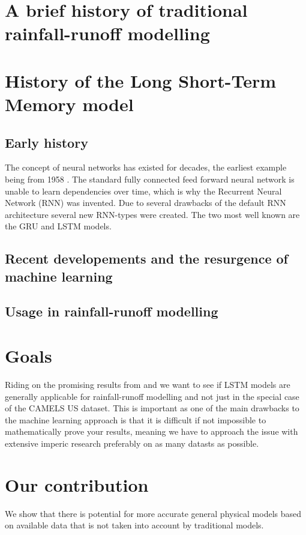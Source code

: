 \section{A brief history of traditional rainfall-runoff modelling}

\section{History of the Long Short-Term Memory model}
\subsection{Early history}
The concept of neural networks has existed for decades, the earliest example being 
from 1958 \cite{rosenblatt1958perceptron}. The standard fully connected feed forward 
neural network is unable to learn dependencies over time, which is why the Recurrent 
Neural Network (RNN) was invented. \citationneeded
Due to several drawbacks of the default RNN architecture several new RNN-types 
were created. The two most well known are the GRU and LSTM models. \citationneeded
\subsection{Recent developements and the resurgence of machine learning}
\subsection{Usage in rainfall-runoff modelling}

\section{Goals}
Riding on the promising results from \cite{lstm_second_paper} and \cite{lstm_third_paper}
we want to see if LSTM models are generally applicable for rainfall-runoff modelling 
and not just in the special case of the CAMELS US \cite{CAMELS_US} dataset. This 
is important as one of the main drawbacks to the machine learning approach is that 
it is difficult if not impossible to mathematically prove your results, meaning 
we have to approach the issue with extensive imperic research preferably on as 
many datasts as possible. 
\section{Our contribution}
We show that there is potential for more accurate general physical models based on
available data that is not taken into account by traditional models.

